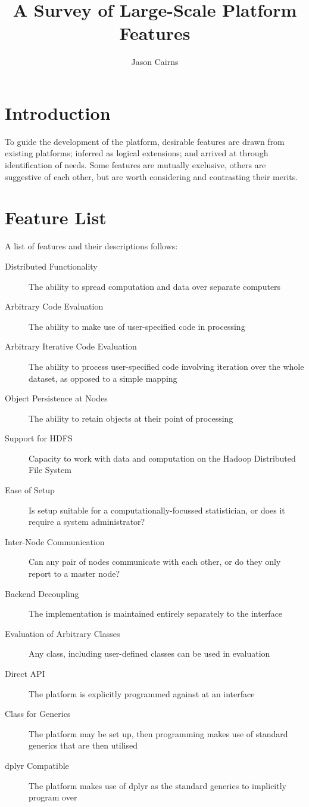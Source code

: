 \documentclass[a4paper,10pt]{article}
\begin{document}
\title{A Survey of Large-Scale Platform Features}
\author{Jason Cairns}
  
\maketitle

\section{Introduction}\label{sec:intro}

To guide the development of the platform, desirable features are drawn from
existing platforms; inferred as logical extensions; and arrived at through
identification of needs. Some features are mutually exclusive, others are
suggestive of each other, but are worth considering and contrasting their
merits.

\section{Feature List}\label{sec:feature-list}

A list of features and their descriptions follows:

\begin{description}
	\item[Distributed Functionality] The ability to spread computation and data
	      over separate computers
	\item[Arbitrary Code Evaluation] The ability to make use of user-specified code
	      in processing
	\item[Arbitrary Iterative Code Evaluation] The ability to process
	      user-specified code involving iteration over the whole dataset, as opposed to a
	      simple mapping
	\item[Object Persistence at Nodes] The ability to retain objects at their point
	      of processing
	\item[Support for HDFS] Capacity to work with data and computation on the
	      Hadoop Distributed File System
	\item[Ease of Setup] Is setup suitable for a computationally-focussed
	      statistician, or does it require a system administrator?
	\item[Inter-Node Communication] Can any pair of nodes communicate with each
	      other, or do they only report to a master node?
	\item[Backend Decoupling] The implementation is maintained entirely separately
	      to the interface
	\item[Evaluation of Arbitrary Classes] Any class, including user-defined
	      classes can be used in evaluation
	\item[Direct API] The platform is explicitly programmed against at an interface
	\item[Class for Generics] The platform may be set up, then programming makes
	      use of standard generics that are then utilised
	\item[dplyr Compatible] The platform makes use of dplyr as the standard
	      generics to implicitly program over
\end{description}
\end{document}
